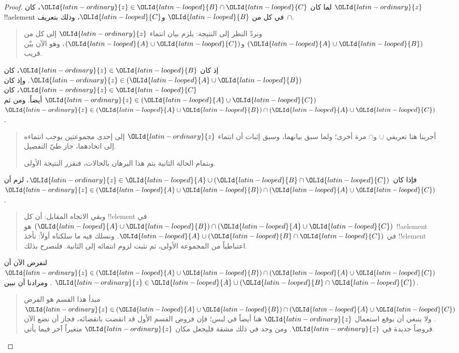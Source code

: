 \documentclass[../../../include/open-logic-section]{subfiles}
\begin{document}
\begin{proof}
لما كان $\OLId{latin-ordinary}{z} \in \OLId{latin-looped}{B} \cap \OLId{latin-looped}{C}$، كان $\OLId{latin-ordinary}{z}$ !!a{element} في كل من $\OLId{latin-looped}{B}$ و$\OLId{latin-looped}{C}$،
وذلك بتعريف~$\cap$.
\begin{quote}
ونردّ النظر إلى النتيجة: يلزم بيان انتماء $\OLId{latin-ordinary}{z}$ إلى كل من
$(\OLId{latin-looped}{A} \cup \OLId{latin-looped}{B})$ و$(\OLId{latin-looped}{A} \cup \OLId{latin-looped}{C})$، وهو الآن بيّن قريب.
\end{quote}
إذ كان $\OLId{latin-ordinary}{z} \in \OLId{latin-looped}{B}$، كان $\OLId{latin-ordinary}{z} \in (\OLId{latin-looped}{A} \cup \OLId{latin-looped}{B})$. وإذ كان $\OLId{latin-ordinary}{z} \in \OLId{latin-looped}{C}$، كان
$\OLId{latin-ordinary}{z} \in (\OLId{latin-looped}{A} \cup \OLId{latin-looped}{C})$ أيضاً. ومن ثم
$\OLId{latin-ordinary}{z} \in (\OLId{latin-looped}{A} \cup \OLId{latin-looped}{B}) \cap (\OLId{latin-looped}{A} \cup \OLId{latin-looped}{C})$.
\begin{quote}
أجرينا هنا تعريفي $\cup$ و$\cap$ مرة أخرى؛ ولما سبق بيانهما، وسبق
إثبات أن انتماء $\OLId{latin-ordinary}{z}$ إلى إحدى مجموعتين يوجب انتماءه إلى اتحادهما، جاز
طيّ التفصيل.

وبتمام الحالة الثانية يتم هذا البرهان بالحالات، فنقرر النتيجة الأولى.
\end{quote}
فإذا كان $\OLId{latin-ordinary}{z} \in \OLId{latin-looped}{A} \cup (\OLId{latin-looped}{B} \cap \OLId{latin-looped}{C})$، لزم أن
$\OLId{latin-ordinary}{z} \in (\OLId{latin-looped}{A} \cup \OLId{latin-looped}{B}) \cap (\OLId{latin-looped}{A} \cup \OLId{latin-looped}{C})$.
\begin{quote}
وبقي الاتجاه المقابل: أن كل !!{element} في
$(\OLId{latin-looped}{A} \cup \OLId{latin-looped}{B}) \cap (\OLId{latin-looped}{A} \cup \OLId{latin-looped}{C})$ هو !!a{element} في
$\OLId{latin-looped}{A} \cup (\OLId{latin-looped}{B} \cap \OLId{latin-looped}{C})$. ونسلك فيه ما سلكناه أولاً: نأخذ !!{element}
اعتباطياً من المجموعة الأولى، ثم نثبت لزوم انتمائه إلى الثانية.
فلنصرح بذلك.
\end{quote}
لنفرض الآن أن $\OLId{latin-ordinary}{z} \in (\OLId{latin-looped}{A} \cup \OLId{latin-looped}{B}) \cap (\OLId{latin-looped}{A} \cup \OLId{latin-looped}{C})$. ومرادنا أن نبين
$\OLId{latin-ordinary}{z} \in \OLId{latin-looped}{A} \cup (\OLId{latin-looped}{B} \cap \OLId{latin-looped}{C})$.
\begin{quote}
مبدأ هذا القسم هو الفرض $\OLId{latin-ordinary}{z} \in (\OLId{latin-looped}{A} \cup \OLId{latin-looped}{B}) \cap (\OLId{latin-looped}{A} \cup \OLId{latin-looped}{C})$. ولا
ينبغي أن يوقع استعمال $\OLId{latin-ordinary}{z}$ هنا أيضاً في لبس؛ فإن فروض القسم الأول قد
انقضت بانقضائه، فجاز أن نضع الآن فروضاً جديدة في $\OLId{latin-ordinary}{z}$. ومن وجد في ذلك
مشقة فليجعل مكان $\OLId{latin-ordinary}{z}$ متغيراً آخر فيما يأتي.


\end{quote}
\end{proof}
\end{document}

